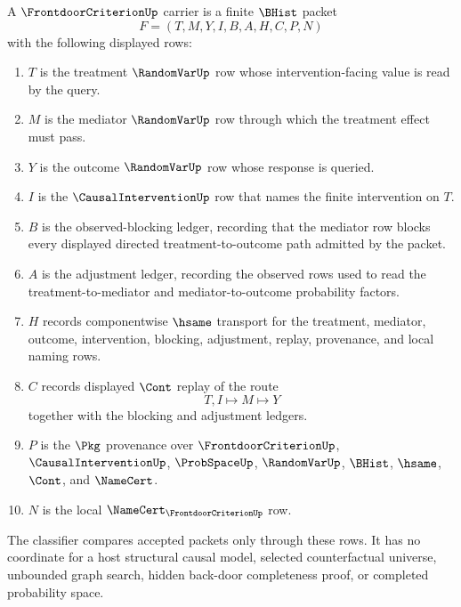 \begin{definition}
\label{def:frontdoor-criterion-carrier}
A $\FrontdoorCriterionUp$ carrier is a finite $\BHist$ packet
$$
F=(T,M,Y,I,B,A,H,C,P,N)
$$
with the following displayed rows:
\begin{enumerate}
\item $T$ is the treatment $\RandomVarUp$ row whose intervention-facing value is read by the query.
\item $M$ is the mediator $\RandomVarUp$ row through which the treatment effect must pass.
\item $Y$ is the outcome $\RandomVarUp$ row whose response is queried.
\item $I$ is the $\CausalInterventionUp$ row that names the finite intervention on $T$.
\item $B$ is the observed-blocking ledger, recording that the mediator row blocks every displayed directed treatment-to-outcome path admitted by the packet.
\item $A$ is the adjustment ledger, recording the observed rows used to read the treatment-to-mediator and mediator-to-outcome probability factors.
\item $H$ records componentwise $\hsame$ transport for the treatment, mediator, outcome, intervention, blocking, adjustment, replay, provenance, and local naming rows.
\item $C$ records displayed $\Cont$ replay of the route
$$
T,I \longmapsto M \longmapsto Y
$$
together with the blocking and adjustment ledgers.
\item $P$ is the $\Pkg$ provenance over $\FrontdoorCriterionUp$, $\CausalInterventionUp$, $\ProbSpaceUp$, $\RandomVarUp$, $\BHist$, $\hsame$, $\Cont$, and $\NameCert$.
\item $N$ is the local $\NameCert_{\FrontdoorCriterionUp}$ row.
\end{enumerate}
The classifier compares accepted packets only through these rows. It has no coordinate for a host structural causal model, selected counterfactual universe, unbounded graph search, hidden back-door completeness proof, or completed probability space.
\end{definition}

